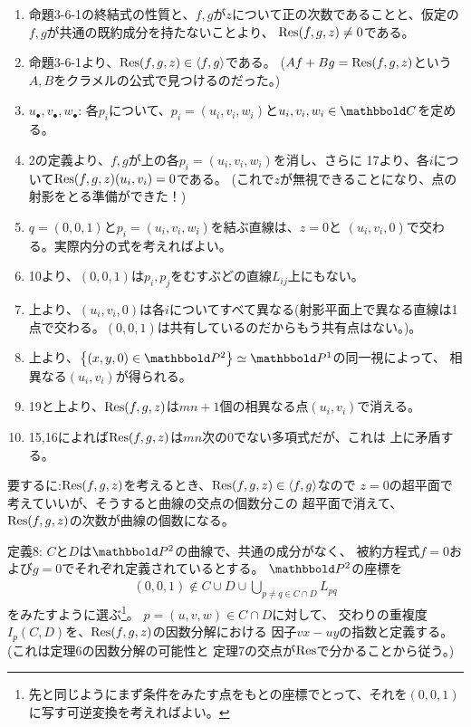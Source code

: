 \begin{myproof}
\begin{enumerate}
    \item
    命題3-6-1の終結式の性質と、$f,g$が$z$について正の次数であることと、仮定の$f,g$が共通の既約成分を持たないことより、
    $\mathrm{Res}(f,g,z) \neq 0$である。
    \item
    命題3-6-1より、$\mathrm{Res}(f,g,z)\in \left\langle f,g \right\rangle$である。
    ($Af+Bg=\mathrm{Res}(f,g,z)$という$A,B$をクラメルの公式で見つけるのだった。)
    \item $u_\bullet,v_\bullet,w_\bullet$:
    各$p_i$について、$p_i = (u_i,v_i,w_i)$と$u_i,v_i,w_i \in \C$を定める。
    \item
    2の定義より、$f,g$が上の各$p_i=(u_i,v_i,w_i)$を消し、さらに
    17より、各$i$について$\mathrm{Res}(f,g,z)(u_i,v_i)  = 0$である。
    (これで$z$が無視できることになり、点の射影をとる準備ができた！)
    \item
    $q=(0,0,1)$と$p_i=(u_i,v_i,w_i)$を結ぶ直線は、$z=0$と
    $(u_i,v_i,0)$で交わる。実際内分の式を考えればよい。
    \item
    10より、$(0,0,1)$は$p_i,p_j$をむすぶどの直線$L_{ij}$上にもない。
    \item
    上より、$(u_i,v_i,0)$は各$i$についてすべて異なる(射影平面上で異なる直線は1点で交わる。$(0,0,1)$は共有しているのだからもう共有点はない。)。
    \item
    上より、$\set{(x,y,0) \in \P^2} \simeq \P^1$の同一視によって、
    相異なる$(u_i,v_i)$が得られる。
    \item
    19と上より、$\mathrm{Res}(f,g,z)$は$mn+1$個の相異なる点$(u_i,v_i)$で消える。
    \item
    15,16によれば$\mathrm{Res}(f,g,z)$は$mn$次の0でない多項式だが、これは
    上に矛盾する。
  \end{enumerate}
  要するに:$\mathrm{Res}(f,g,z)$を考えるとき、$\mathrm{Res}(f,g,z) \in \left\langle f,g \right\rangle$なので
  $z=0$の超平面で考えていいが、そうすると曲線の交点の個数分この
  超平面で消えて、$\mathrm{Res}(f,g,z)$の次数が曲線の個数になる。

\end{myproof}

\begin{framed}
  定義8:
  $C$と$D$は$\P^2$の曲線で、共通の成分がなく、
  被約方程式$f=0$および$g=0$でそれぞれ定義されているとする。
  $\P^2$の座標を
  \begin{align}
    (0,0,1) \notin C\cup D \cup \bigcup_{p\neq q \in C\cap D}L_{pq}
  \end{align}
  をみたすように選ぶ\footnote{先と同じようにまず条件をみたす点をもとの座標でとって、それを$(0,0,1)$に写す可逆変換を考えればよい。}。 $p=(u,v,w) \in C\cap D$に対して、
  交わりの重複度$I_p(C,D)$を、$\mathrm{Res}(f,g,z)$の因数分解における
  因子$vx-uy$の指数と定義する。(これは定理6の因数分解の可能性と
  定理7の交点が$\mathrm{Res}$で分かることから従う。)
\end{framed}

